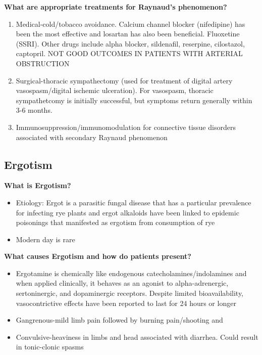 \documentclass[
]{book}
\begin{document}
\textbf{What are appropriate treatments for Raynaud's phenomenon?}

\begin{enumerate}
\def\labelenumi{\arabic{enumi}.}
\item
  Medical-cold/tobacco avoidance. Calcium channel blocker (nifedipine)
  has been the most effective and losartan has also been beneficial.
  Fluoxetine (SSRI). Other drugs include alpha blocker, sildenafil,
  reserpine, cilostazol, captopril. NOT GOOD OUTCOMES IN PATIENTS WITH
  ARTERIAL OBSTRUCTION~
\item
  Surgical-thoracic sympathectomy (used for treatment of digital
  artery vasospasm/digital ischemic ulceration). For vasospasm,
  thoracic sympathetcomy is initially successful, but symptoms return
  generally within 3-6 months.~
\item
  Immunosuppression/immunomodulation for connective tissue disorders
  associated with secondary Raynaud phenomenon
\end{enumerate}

\hypertarget{ergotism}{%
\subsection{\texorpdfstring{\textbf{Ergotism}}{Ergotism}}\label{ergotism}}

\textbf{What is Ergotism?} \citep{jamescstanleyCurrentTherapyVascular2014}

\begin{itemize}
\item
  Etiology: Ergot is a parasitic fungal disease that has a particular
  prevalence for infecting rye plants and ergot alkaloids have been
  linked to epidemic poisonings that manifested as ergotism from
  consumption of rye~
\item
  Modern day is rare
\end{itemize}

\textbf{What causes Ergotism and how do patients present?}

\begin{itemize}
\item
  Ergotamine is chemically like endogenous catecholamines/indolamines
  and when applied clinically, it behaves as an agonist to
  alpha-adrenergic, sertoninergic, and dopaminergic receptors. Despite
  limited bioavailability, vasocontrictive effects have been reported
  to last for 24 hours or longer~
\item
  Gangrenous-mild limb pain followed by burning pain/shooting and~
\item
  Convulsive-heaviness in limbs and head associated with diarrhea.
  Could result in tonic-clonic spasms~
\end{itemize}
\end{document}

